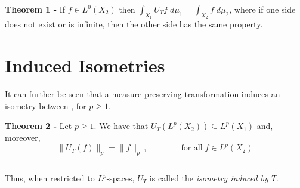 \documentclass[12pt]{article}
\begin{document}
{\bf Theorem 1 -} If $f \in L^0(X_2)$ then $\int_{X_1} U_Tf\;d\mu_1 = \int_{X_2} f\;d\mu_2$, where if one side does not exist or is infinite, then the other side has the same property.


\section{Induced Isometries}
 It can further be seen that a measure-preserving transformation induces an isometry between , for $p \geq 1$.


{\bf Theorem 2 -} Let $p \geq 1$. We have that $U_T(L^p(X_2)) \subseteq L^p(X_1)$ and, moreover,
\begin{displaymath}
\|U_T(f)\|_p = \|f\|_p\,, \qquad\qquad \text{for all}\; f \in L^p(X_2)
\end{displaymath}

$\,$

Thus, when restricted to $L^p$-spaces, $U_T$ is called the \emph{isometry induced by $T$}.
\end{document}
